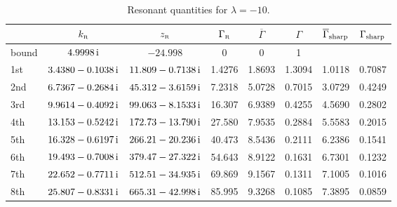 \documentclass[12pt]{article}
\newcommand{\rmi}{{\rm i}}
\newcommand{\zr}{z_{\text{\tiny R}}}
\newcommand{\gr}{\Gamma _{\text{\tiny R}}}
\newcommand{\kr}{k_{\text{\tiny R}}}
\begin{document}
\begin{table}[H]
\centering
\vspace{6pt}
\begin{tabular}{|l| c| c| c| c | c | c | c|} %
\hline\hline
      & $\kr$ & $\zr$ & $\gr$ & $\overline{\Gamma}$ & $\Gamma$ & 
$\overline{\Gamma}_{\rm sharp}$
& $\Gamma_{\rm sharp}$  \\
\hline


bound & $4.9998 \, \rmi$ &  $-24.998$ & 
0 & 0 & 1 &  &     \\

1st & $3.4380 -0.1038 \, \rmi$ & $11.809 -0.7138 \, \rmi$ & 
1.4276 & 1.8693 & 1.3094 & 1.0118 & 0.7087  \\

2nd &  $6.7367 -0.2684 \, \rmi$ & $45.312 -3.6159 \, \rmi$ & 
7.2318 & 5.0728 & 0.7015 & 3.0729 & 0.4249 \\

3rd & $9.9614 -0.4092 \, \rmi$ & $99.063 -8.1533 \, \rmi$ & 
16.307 & 6.9389 & 0.4255 & 4.5690 & 0.2802  \\

4th & $13.153 -0.5242 \, \rmi$ & $172.73 -13.790 \, \rmi$ & 
27.580 & 7.9535 & 0.2884 & 5.5583 & 0.2015  \\

5th &  $16.328 -0.6197 \, \rmi$ & $266.21 -20.236 \, \rmi$ & 
40.473 & 8.5436 & 0.2111 & 6.2386 & 0.1541  \\

6th & $19.493 -0.7008 \, \rmi$ & $379.47 -27.322 \, \rmi$ & 
54.643 & 8.9122 & 0.1631 & 6.7301 & 0.1232  \\

7th & $22.652 -0.7711 \, \rmi$ & $512.51 -34.935 \, \rmi$ & 
69.869 & 9.1567 & 0.1311 & 7.1005 & 0.1016  \\

8th & $25.807 -0.8331 \, \rmi$ & $665.31 -42.998 \, \rmi$ & 
85.995 & 9.3268 & 0.1085 & 7.3895 & 0.0859  \\


 



\hline\hline 
\end{tabular}
\caption{Resonant quantities for $\lambda =-10$.} 
\label{table:-10}
\end{table}
\end{document}
